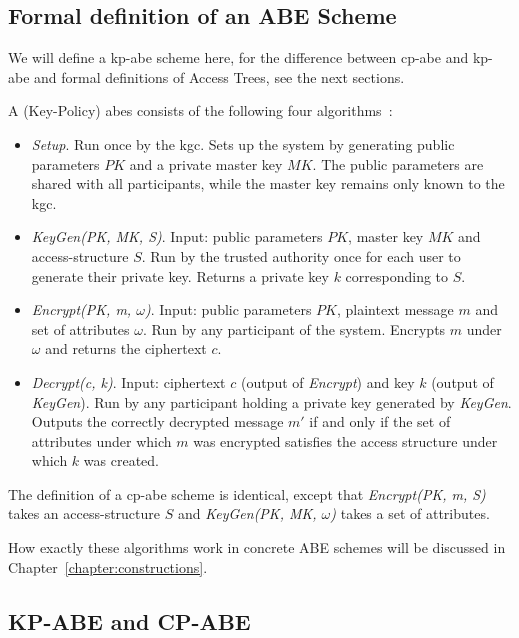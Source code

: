 \subsection{Formal definition of an ABE Scheme}\label{sec:definition-es}

We will define a \acrshort{kp-abe} scheme here, for the difference between \acrshort{cp-abe} and \acrshort{kp-abe} and formal definitions of Access Trees, see the next sections.

\begin{definition}
    A (Key-Policy) \Acrlong{abes} consists of the following four algorithms~\cite{goyal_attribute-based_2006}:
    \begin{itemize}
        \item \emph{Setup}. Run once by the \acrfull{kgc}. Sets up the system by generating public parameters $PK$ and a private master key $MK$. The public parameters are shared with all participants, while the master key remains only known to the \acrshort{kgc}.
        \item \emph{KeyGen(PK, MK, S)}. Input: public parameters $PK$, master key $MK$ and \gls{access-structure} $S$.
        Run by the trusted authority once for each user to generate their private key. Returns a private key $k$ corresponding to $S$.
        \item \emph{Encrypt(PK, m, $\omega$)}. Input: public parameters $PK$, plaintext message $m$ and set of attributes $\omega$.
        Run by any participant of the system. Encrypts $m$ under $\omega$ and returns the ciphertext $c$.
        \item \emph{Decrypt(c, k)}. Input: ciphertext $c$ (output of \emph{Encrypt}) and key $k$ (output of \emph{KeyGen}).
        Run by any participant holding a private key generated by \emph{KeyGen}. Outputs the correctly decrypted message $m'$ if and only if the set of attributes under which $m$ was encrypted satisfies the access structure under which $k$ was created.
    \end{itemize}
\end{definition}

The definition of a \acrshort{cp-abe} scheme is identical, except that \emph{Encrypt(PK, m, S)} takes an \gls{access-structure} $S$ and \emph{KeyGen(PK, MK, $\omega$)} takes a set of attributes.

How exactly these algorithms work in concrete ABE schemes will be discussed in Chapter~\ref{chapter:constructions}.

\subsection{KP-ABE and CP-ABE}\label{sec:cp-vs-kp}



